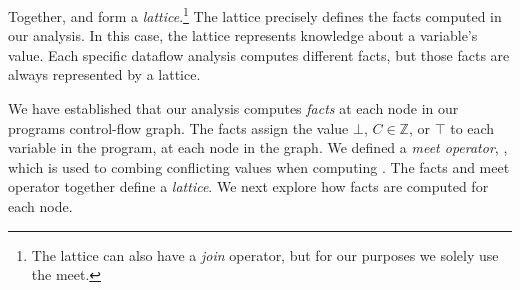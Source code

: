 \documentclass[12pt]{report}
\begin{document}
Together, \setLC and \lub form a \emph{lattice}.\footnote{The lattice
  can also have a \emph{join} operator, but for our purposes we solely
  use the meet.}  The lattice precisely defines the facts computed in
our analysis. In this case, the lattice represents
knowledge about a variable's value. Each specific dataflow analysis
computes different facts, but those facts are always represented by a
lattice.

We have established that our analysis computes \emph{facts} at each
node in our programs control-flow graph. The facts assign the value
$\bot$, $C \in \mathbb{Z}$, or $\top$ to each variable in the program,
at each node in the graph. We defined a \emph{meet operator}, \lub,
which is used to combing conflicting values when computing \inBa.  The
facts and meet operator together define a \emph{lattice}. We next
explore how \out facts are computed for each node.




\end{document}

